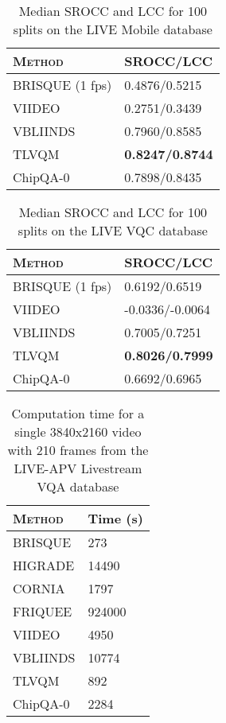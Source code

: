 \documentclass[conference]{IEEEtran}
\begin{document}
\begin{table}[ht]
\caption{Median SROCC and LCC for 100 splits on the LIVE Mobile database}
\begin{center}
\begin{tabular}{|l|l|}
\hline
\textsc{Method} &  SROCC/LCC \\
\hline
BRISQUE\cite{brisque} (1 fps) & 0.4876/0.5215 \\
\hline
VIIDEO\cite{viideo} & 0.2751/0.3439 \\
\hline
VBLIINDS\cite{vbliinds} & 0.7960/0.8585 \\
\hline
TLVQM\cite{tlvqm} & \textbf{0.8247/0.8744} \\
\hline
ChipQA-0 & 0.7898/0.8435  \\
\hline
\end{tabular}
\label{mobile}
\end{center}
\end{table}

\begin{table}
\centering
\caption{Median SROCC and LCC for 100 splits on the LIVE VQC database}\label{vqc}
\begin{tabular}{|l|l|}
\hline
\textsc{Method}  &  SROCC/LCC \\
\hline
BRISQUE\cite{brisque} (1 fps) & 0.6192/0.6519 \\
\hline
VIIDEO\cite{viideo} & -0.0336/-0.0064 \\
\hline
VBLIINDS\cite{vbliinds} & 0.7005/0.7251 \\
\hline
TLVQM\cite{tlvqm} & \textbf{0.8026/0.7999} \\
\hline
ChipQA-0 & 0.6692/0.6965  \\
\hline
\end{tabular}
\end{table}

\begin{table}
\centering
\caption{Computation time for a single 3840x2160 video with 210 frames from the LIVE-APV Livestream VQA database}\label{compcost}
\begin{tabular}{|l|l|}
\hline
\textsc{Method}  &  Time (s) \\
\hline
BRISQUE\cite{brisque} & 273 \\
\hline
HIGRADE\cite{higrade} & 14490 \\
\hline
CORNIA\cite{cornia} & 1797\\
\hline
FRIQUEE\cite{friquee} & 924000\\
\hline
VIIDEO\cite{viideo} & 4950 \\
\hline
VBLIINDS\cite{vbliinds} & 10774 \\
\hline
TLVQM\cite{tlvqm} & 892 \\
\hline
ChipQA-0 & 2284  \\
\hline
\end{tabular}
\end{table}
\end{document}
